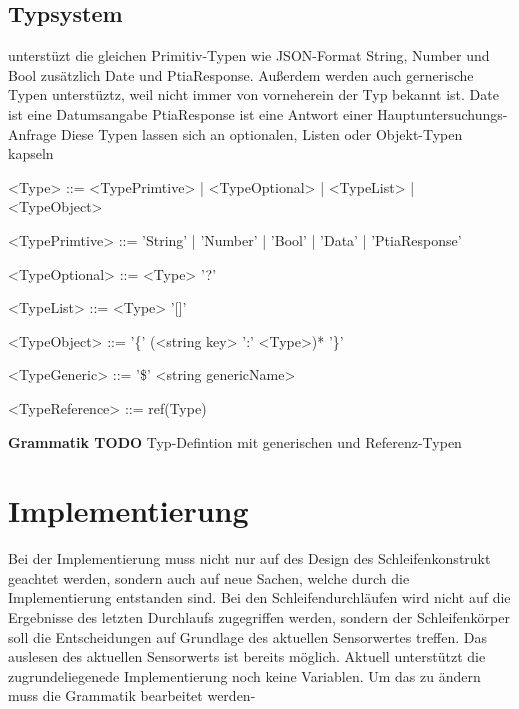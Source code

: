 \documentclass{article}
\begin{document}
    \subsection{Typsystem}
    unterstüzt die gleichen Primitiv-Typen wie JSON-Format String, Number und Bool zusätzlich Date und PtiaResponse. Außerdem werden auch gernerische Typen unterstüztz, weil nicht immer von vorneherein der Typ bekannt ist.
    Date ist eine Datumsangabe
    PtiaResponse ist eine Antwort einer Hauptuntersuchungs-Anfrage
    Diese Typen lassen sich an optionalen, Listen oder Objekt-Typen kapseln\\
    \begin{grammar}
        <Type> ::= <TypePrimtive> | <TypeOptional> | <TypeList> | <TypeObject>

        <TypePrimtive> ::= 'String' | 'Number' | 'Bool' | 'Data' | 'PtiaResponse'
        
        <TypeOptional> ::= <Type> '?'
        
        <TypeList> ::= <Type> '[]'
        
        <TypeObject> ::= '\{' (<string key> ':' <Type>)* '\}'

        <TypeGeneric> ::= '\$' <string genericName>

        <TypeReference> ::= ref(Type)
    \end{grammar}
    \textbf{Grammatik TODO} Typ-Defintion mit generischen und Referenz-Typen
    \newpage
    \section{Implementierung}
    Bei der Implementierung muss nicht nur auf des Design des Schleifenkonstrukt geachtet werden, sondern auch auf neue Sachen, welche durch die Implementierung entstanden sind.
    Bei den Schleifendurchläufen wird nicht auf die Ergebnisse des letzten Durchlaufs zugegriffen werden, sondern der Schleifenkörper soll die Entscheidungen auf Grundlage des aktuellen Sensorwertes treffen.
    Das auslesen des aktuellen Sensorwerts ist bereits möglich.
    Aktuell unterstützt die zugrundeliegenede Implementierung noch keine Variablen. Um das zu ändern muss die Grammatik bearbeitet werden-
\end{document}
